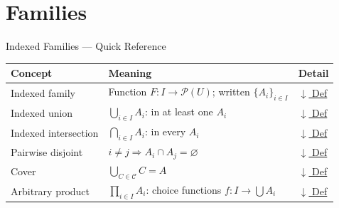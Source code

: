 \section{Families}


\begin{toolkitbox}{Indexed Families --- Quick Reference}
\small
\begin{tabular}{l l l}
\toprule
\textbf{Concept} & \textbf{Meaning} & \textbf{Detail} \\
\midrule
Indexed family      & Function $F : I \to \mathcal{P}(U)$; written $\{A_i\}_{i \in I}$ & \hyperref[def:indexed-family]{$\downarrow$ Def} \\
Indexed union       & $\bigcup_{i \in I} A_i$: in at least one $A_i$                    & \hyperref[def:indexed-union]{$\downarrow$ Def} \\
Indexed intersection & $\bigcap_{i \in I} A_i$: in every $A_i$                         & \hyperref[def:indexed-intersection]{$\downarrow$ Def} \\
Pairwise disjoint   & $i \neq j \Rightarrow A_i \cap A_j = \varnothing$                  & \hyperref[def:pairwise-disjoint]{$\downarrow$ Def} \\
Cover               & $\bigcup_{C \in \mathcal{C}} C = A$                               & \hyperref[def:cover]{$\downarrow$ Def} \\
Arbitrary product   & $\prod_{i \in I} A_i$: choice functions $f : I \to \bigcup A_i$   & \hyperref[def:arbitrary-product]{$\downarrow$ Def} \\
\bottomrule
\end{tabular}
\end{toolkitbox}



